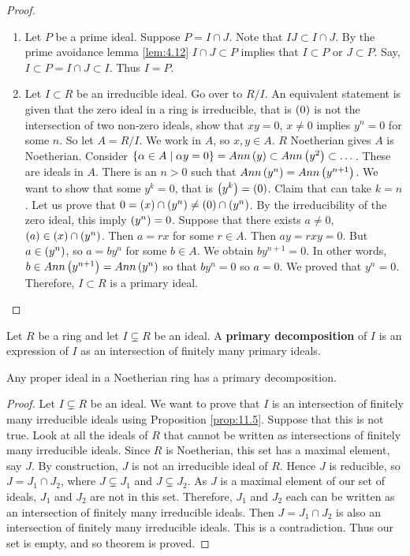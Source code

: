 \begin{proof}
\hfill
\begin{enumerate}
\item Let $ P $ be a prime ideal. Suppose $ P = I \cap J $. Note that $ IJ \subset I \cap J $. By the prime avoidance lemma \ref{lem:4.12} $ I \cap J \subset P $ implies that $ I \subset P $ or $ J \subset P $. Say, $ I \subset P = I \cap J \subset I $. Thus $ I = P $.
\item Let $ I \subset R $ be an irreducible ideal. Go over to $ R / I $. An equivalent statement is given that the zero ideal in a ring is irreducible, that is $ \left( 0 \right) $ is not the intersection of two non-zero ideals, show that $ xy = 0 $, $ x \ne 0 $ implies $ y^n = 0 $ for some $ n $. So let $ A = R / I $. We work in $ A $, so $ x, y \in A $. $ R $ Noetherian gives $ A $ is Noetherian. Consider $ \left\{ \alpha \in A \mid \alpha y = 0 \right\} = Ann\left( y \right) \subset Ann\left( y^2 \right) \subset \dots $. These are ideals in $ A $. There is an $ n > 0 $ such that $ Ann\left( y^n \right) = Ann\left( y^{n + 1} \right) $. We want to show that some $ y^k = 0 $, that is $ \left( y^k \right) = \left( 0 \right) $. Claim that can take $ k = n $. Let us prove that $ 0 = \left( x \right) \cap \left( y^n \right) \ne \left( 0 \right) \cap \left( y^n \right) $. By the irreducibility of the zero ideal, this imply $ \left( y^n \right) = 0 $. Suppose that there exists $ a \ne 0 $, $ \left( a \right) \in \left( x \right) \cap \left( y^n \right) $. Then $ a = rx $ for some $ r \in A $. Then $ ay = rxy = 0 $. But $ a \in \left( y^n \right) $, so $ a = by^n $ for some $ b \in A $. We obtain $ by^{n + 1} = 0 $. In other words, $ b \in Ann\left( y^{n + 1} \right) = Ann\left( y^n \right) $ so that $ by^n = 0 $ so $ a = 0 $. We proved that $ y^n = 0 $. Therefore, $ I \subset R $ is a primary ideal.
\end{enumerate}
\end{proof}

Let $ R $ be a ring and let $ I \subsetneq R $ be an ideal. A \textbf{primary decomposition} of $ I $ is an expression of $ I $ as an intersection of finitely many primary ideals.

\begin{theorem}[Noether]
Any proper ideal in a Noetherian ring has a primary decomposition.
\end{theorem}

\begin{proof}
Let $ I \subsetneq R $ be an ideal. We want to prove that $ I $ is an intersection of finitely many irreducible ideals using Proposition \ref{prop:11.5}. Suppose that this is not true. Look at all the ideals of $ R $ that cannot be written as intersections of finitely many irreducible ideals. Since $ R $ is Noetherian, this set has a maximal element, say $ J $. By construction, $ J $ is not an irreducible ideal of $ R $. Hence $ J $ is reducible, so $ J = J_1 \cap J_2 $, where $ J \subsetneq J_1 $ and $ J \subsetneq J_2 $. As $ J $ is a maximal element of our set of ideals, $ J_1 $ and $ J_2 $ are not in this set. Therefore, $ J_1 $ and $ J_2 $ each can be written as an intersection of finitely many irreducible ideals. Then $ J = J_1 \cap J_2 $ is also an intersection of finitely many irreducible ideals. This is a contradiction. Thus our set is empty, and so theorem is proved.
\end{proof}

